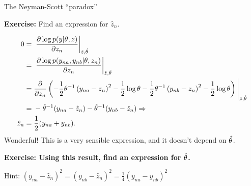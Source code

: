 \begin{frame}{The Neyman-Scott ``paradox''}

\textbf{Exercise:} Find an expression for $\hat{z}_n$.

\begin{align*}
%
0 ={}& \fracat{\partial \log p(y | \theta, z)}{\partial z_n}{\hat{z}, \thetahat} \\
={}& \fracat{\partial \log p(y_{na}, y_{nb} | \theta, z_n)}{\partial z_n}{\hat{z}, \thetahat}\\
={}& \frac{\partial}{\partial z_n}
\left(
-\frac{1}{2} \theta^{-1} \left( y_{na}  - z_n\right)^2 - \frac{1}{2}\log \theta
-\frac{1}{2} \theta^{-1} \left( y_{nb}  - z_n\right)^2 - \frac{1}{2}\log \theta
\right)
\Bigg|_{\hat{z}, \thetahat}\\
={}& - \thetahat^{-1} (y_{na}  - \hat{z}_n)
    - \thetahat^{-1} (y_{nb}  - \hat{z}_n) \Rightarrow \\
\hat{z}_n ={}& \frac{1}{2}(y_{na} + y_{nb}).
%
\end{align*}
%
\pause
%
Wonderful!  This is a very sensible expression, and it doesn't depend on
$\hat\theta$.

\vspace{1em}
\pause
\textbf{Exercise: Using this result, find an expression for $\hat\theta$.}

Hint:
%
$
%
\left( y_{na}  - \hat{z}_n\right)^2 =
\left( y_{nb}  - \hat{z}_n\right)^2 =
\frac{1}{4} \left( y_{na}  - y_{nb}\right)^2
%
$
%

\end{frame}




